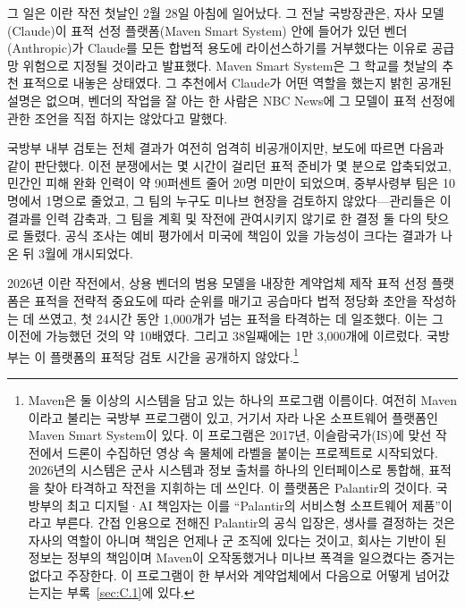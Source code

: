 그 일은 이란 작전 첫날인 2월 28일 아침에 일어났다\autocite{Amnesty2026Minab,crs2026iranwar}. 그 전날 국방장관은, 자사 모델(Claude)이 표적 선정 플랫폼(Maven Smart System) 안에 들어가 있던 벤더(Anthropic)가 Claude를 모든 합법적 용도에 라이선스하기를 거부했다는 이유로 공급망 위험으로 지정될 것이라고 발표했다\autocite{npr2026openai}. Maven Smart System은 그 학교를 첫날의 추천 표적으로 내놓은 상태였다\autocite{livingstone2026maven,gizmodo2026minab}. 그 추천에서 Claude가 어떤 역할을 했는지 밝힌 공개된 설명은 없으며, 벤더의 작업을 잘 아는 한 사람은 NBC News에 그 모델이 표적 선정에 관한 조언을 직접 하지는 않았다고 말했다\autocite{nbc2026targeting}.

국방부 내부 검토는 전체 결과가 여전히 엄격히 비공개이지만, 보도에 따르면 다음과 같이 판단했다. 이전 분쟁에서는 몇 시간이 걸리던 표적 준비가 몇 분으로 압축되었고, 민간인 피해 완화 인력이 약 90퍼센트 줄어 20명 미만이 되었으며, 중부사령부 팀은 10명에서 1명으로 줄었고, 그 팀의 누구도 미나브 현장을 검토하지 않았다—관리들은 이 결과를 인력 감축과, 그 팀을 계획 및 작전에 관여시키지 않기로 한 결정 둘 다의 탓으로 돌렸다\autocite{Bloomberg2026KillChain}. 공식 조사는 예비 평가에서 미국에 책임이 있을 가능성이 크다는 결과가 나온 뒤 3월에 개시되었다\autocite{NPR2026MinabProbe}.

2026년 이란 작전에서, 상용 벤더의 범용 모델을 내장한 계약업체 제작 표적 선정 플랫폼은 표적을 전략적 중요도에 따라 순위를 매기고 공습마다 법적 정당화 초안을 작성하는 데 쓰였고\autocite{livingstone2026maven}, 첫 24시간 동안 1,000개가 넘는 표적을 타격하는 데 일조했다. 이는 그 이전에 가능했던 것의 약 10배였다\autocite{csis2026maven}. 그리고 38일째에는 1만 3,000개에 이르렀다\autocite{breakingdefense2026maven}. 국방부는 이 플랫폼의 표적당 검토 시간을 공개하지 않았다.\footnote{Maven은 둘 이상의 시스템을 담고 있는 하나의 프로그램 이름이다. 여전히 Maven이라고 불리는 국방부 프로그램이 있고, 거기서 자라 나온 소프트웨어 플랫폼인 Maven Smart System이 있다\autocite{csis2026maven}. 이 프로그램은 2017년, 이슬람국가(IS)에 맞선 작전에서 드론이 수집하던 영상 속 물체에 라벨을 붙이는 프로젝트로 시작되었다\autocite{weisgerber2017maven,fang2019maven}. 2026년의 시스템은 군사 시스템과 정보 출처를 하나의 인터페이스로 통합해, 표적을 찾아 타격하고 작전을 지휘하는 데 쓰인다\autocite{defensescoop2026transition}. 이 플랫폼은 Palantir의 것이다. 국방부의 최고 디지털·AI 책임자는 이를 “Palantir의 서비스형 소프트웨어 제품”이라고 부른다\autocite{defensescoop2026transition}. 간접 인용으로 전해진 Palantir의 공식 입장은, 생사를 결정하는 것은 자사의 역할이 아니며 책임은 언제나 군 조직에 있다는 것이고\autocite{lee2026palantir}, 회사는 기반이 된 정보는 정부의 책임이며 Maven이 오작동했거나 미나브 폭격을 일으켰다는 증거는 없다고 주장한다\autocite{Bloomberg2026KillChain}. 이 프로그램이 한 부서와 계약업체에서 다음으로 어떻게 넘어갔는지는 부록~\ref{sec:C.1}에 있다.}

